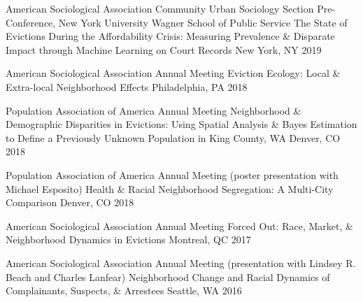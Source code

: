 


\begin{cventries}
    
  \cventry
    {American Sociological Association Community Urban Sociology Section Pre-Conference, New York University Wagner School of Public Service} %
    {The State of Evictions During the Affordability Crisis: Measuring Prevalence \& Disparate Impact through Machine Learning on Court Records} %
    {New York, NY} %
    {2019} %
    {}
    
  \cventry
    {American Sociological Association Annual Meeting} %
    {Eviction Ecology: Local \& Extra-local Neighborhood Effects} %
    {Philadelphia, PA} %
    {2018} %
    {}
    
  \cventry
    {Population Association of America Annual Meeting} %
    {Neighborhood \& Demographic Disparities in Evictions: Using Spatial Analysis \& Bayes Estimation to Define a Previously Unknown Population in King County, WA} %
    {Denver, CO} %
    {2018} %
    {}
    
  \cventry
    {Population Association of America Annual Meeting (poster presentation with Michael Esposito)} %
    {Health \& Racial Neighborhood Segregation: A Multi-City Comparison} %
    {Denver, CO} %
    {2018} %
    {}
    
  \cventry
    {American Sociological Association Annual Meeting} %
    {Forced Out: Race, Market, \& Neighborhood Dynamics in Evictions} %
    {Montreal, QC} %
    {2017} %
    {}

  \cventry
    {American Sociological Association Annual Meeting (presentation with Lindsey R. Beach and Charles Lanfear)} %
    {Neighborhood Change and Racial Dynamics of Complainants, Suspects, \& Arrestees} %
    {Seattle, WA} %
    {2016} %
    {}


\end{cventries}
